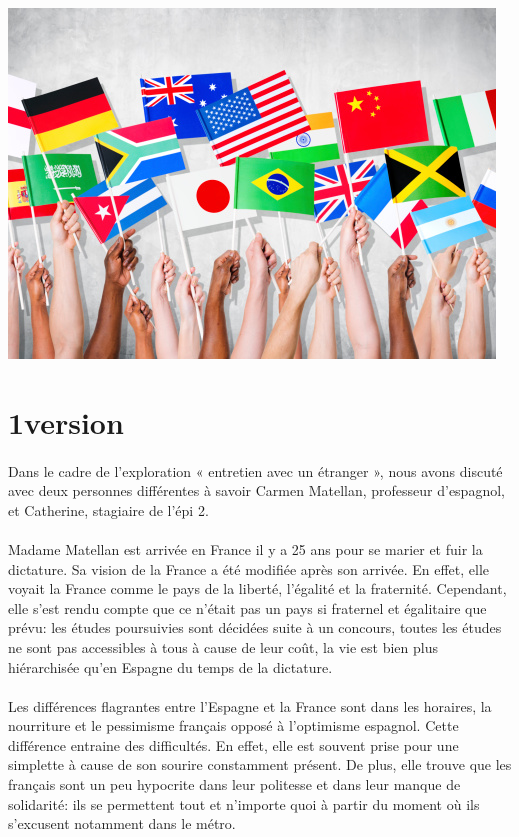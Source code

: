 \begin{center}
	\includegraphics[scale=0.5]{entretien.jpg}
\end{center}

\section{1\iere version}

\paragraph{} Dans le cadre de l'exploration « entretien avec un étranger »,
nous avons discuté avec deux personnes différentes à savoir Carmen Matellan,
professeur d'espagnol, et Catherine, stagiaire de l'épi 2.

\paragraph{} Madame Matellan est arrivée en France il y a 25 ans pour se marier
et fuir la dictature. Sa vision de la France a été modifiée après son arrivée.
En effet, elle voyait la France comme le pays de la liberté, l'égalité et la
fraternité. Cependant, elle s'est rendu compte que ce n'était pas un pays si
fraternel et égalitaire que prévu: les études poursuivies sont décidées suite à
un concours, toutes les études ne sont pas accessibles à tous à cause de leur
coût, la vie est bien plus hiérarchisée qu'en Espagne du temps de la dictature.

\paragraph{} Les différences flagrantes entre l'Espagne et la France sont dans
les horaires, la nourriture et le pessimisme français opposé à l'optimisme
espagnol. Cette différence entraine des difficultés. En effet, elle est souvent
prise pour une simplette à cause de son sourire constamment présent. De plus,
elle trouve que les français sont un peu hypocrite dans leur politesse et dans
leur manque de solidarité: ils se permettent tout et n'importe quoi à partir du
moment où ils s'excusent notamment dans le métro.

